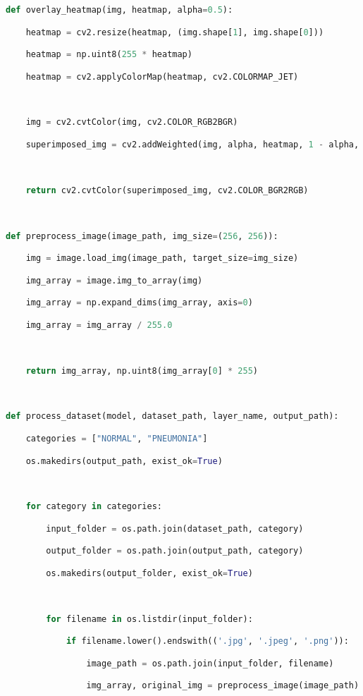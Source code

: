 \documentclass{article}
\begin{document}
\begin{lstlisting}[style=mystyle,language=Python]
def overlay_heatmap(img, heatmap, alpha=0.5):

    heatmap = cv2.resize(heatmap, (img.shape[1], img.shape[0]))

    heatmap = np.uint8(255 * heatmap)

    heatmap = cv2.applyColorMap(heatmap, cv2.COLORMAP_JET)



    img = cv2.cvtColor(img, cv2.COLOR_RGB2BGR)

    superimposed_img = cv2.addWeighted(img, alpha, heatmap, 1 - alpha, 0)



    return cv2.cvtColor(superimposed_img, cv2.COLOR_BGR2RGB)



def preprocess_image(image_path, img_size=(256, 256)):

    img = image.load_img(image_path, target_size=img_size)

    img_array = image.img_to_array(img)

    img_array = np.expand_dims(img_array, axis=0)

    img_array = img_array / 255.0



    return img_array, np.uint8(img_array[0] * 255)



def process_dataset(model, dataset_path, layer_name, output_path):

    categories = ["NORMAL", "PNEUMONIA"]

    os.makedirs(output_path, exist_ok=True)



    for category in categories:

        input_folder = os.path.join(dataset_path, category)

        output_folder = os.path.join(output_path, category)

        os.makedirs(output_folder, exist_ok=True)



        for filename in os.listdir(input_folder):

            if filename.lower().endswith(('.jpg', '.jpeg', '.png')):

                image_path = os.path.join(input_folder, filename)

                img_array, original_img = preprocess_image(image_path)




\end{lstlisting}
\end{document}
